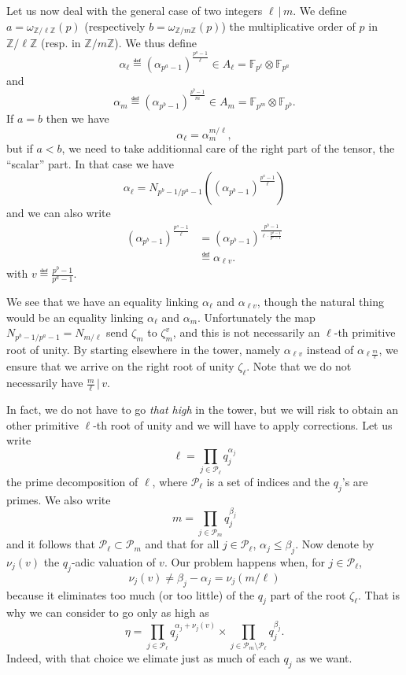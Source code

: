 \documentclass[a4paper,11pt]{article}
\begin{document}
Let us now deal with the general case of two integers $\ell\,|\,m$. We define
$a=\omega_{\mathbb{Z}/\ell\mathbb{Z}}(p)$ (respectively
$b=\omega_{\mathbb{Z}/m\mathbb{Z}}(p)$) the multiplicative order of $p$ in
$\mathbb{Z}/\ell\mathbb{Z}$ (resp. in $\mathbb{Z}/m\mathbb{Z}$). We thus define
\[
  \alpha_\ell\eqdef(\alpha_{p^a-1})^{\frac{p^a-1}{\ell}}\in A_{\ell}=\mathbb{F}_{p^\ell}\otimes \mathbb{F}_{p^a}
\]
and
\[
  \alpha_m\eqdef(\alpha_{p^b-1})^{\frac{p^{b}-1}{m}}\in A_m=\mathbb{F}_{p^m}\otimes \mathbb{F}_{p^b}.
\]
If $a=b$ then we have 
\[
  \alpha_{\ell}=\alpha_m^{m/\ell},
\]
but if $a<b$, we need to take additionnal care of the right part of the tensor,
the ``scalar'' part. In that case we have
\[
  \alpha_\ell=N_{p^b-1/p^a-1}((\alpha_{p^b-1})^{\frac{p^a-1}{\ell}})
\]
and we can also write 
\begin{align*}
  (\alpha_{p^b-1})^{\frac{p^a-1}{\ell}}&=(\alpha_{p^b-1})^{\frac{p^b-1}{\ell\cdot\frac{p^b-1}{p^a-1}}}\\
  &\eqdef \alpha_{\ell v}.
\end{align*}
with $v\eqdef\frac{p^b-1}{p^a-1}$.

We see that we have an equality linking $\alpha_\ell$ and
$\alpha_{\ell v}$, though the natural thing would be an
equality linking $\alpha_\ell$ and $\alpha_m$. Unfortunately the map
$N_{p^b-1/p^a-1}=N_{m/\ell}$ send $\zeta_{m}$ to
$\zeta_{m}^{v}$, and this is not necessarily an $\ell$-th primitive root of unity.
By starting elsewhere in the tower, namely $\alpha_{\ell v}$ instead of
$\alpha_{\ell \frac{m}{\ell}}$, we ensure that we arrive on the right root of
unity $\zeta_{\ell}$. Note that we do not necessarily have
$\frac{m}{\ell}\,|\,v$.

In fact, we do not have to go \emph{that high} in the tower, but we will risk to
obtain an other primitive $\ell$-th root of unity and we will have to apply
corrections. Let us write
\[
  \ell=\prod_{j\in\mathcal P_\ell}q_j^{\alpha_j}
\]
the prime decomposition of $\ell$, where $\mathcal P_\ell$ is a set of indices
and the $q_j$'s are primes. We also write
\[
  m=\prod_{j\in\mathcal P_m}q_j^{\beta_j}
\]
and it follows that $\mathcal P_\ell\subset\mathcal P_m$ and that for all
$j\in\mathcal P_\ell$, $\alpha_j\leq\beta_j$. Now denote by $\nu_j(v)$ the
$q_j$-adic valuation of $v$. Our problem happens when, for $j\in\mathcal
P_\ell$,
\[
  \nu_j(v)\neq \beta_j-\alpha_j=\nu_j(m/\ell)
\]
because it eliminates too much (or too little) of the $q_j$ part of the root $\zeta_\ell$. That
is why we can consider to go only as high as 
\[
  \eta=\prod_{j\in\mathcal
  P_\ell}q_j^{\alpha_j+\nu_j(v)}\times\prod_{j\in\mathcal P_m\setminus \mathcal
  P_\ell}q_j^{\beta_j}.
\]
Indeed, with that choice we elimate just as much of each $q_j$ as we want.
\end{document}
